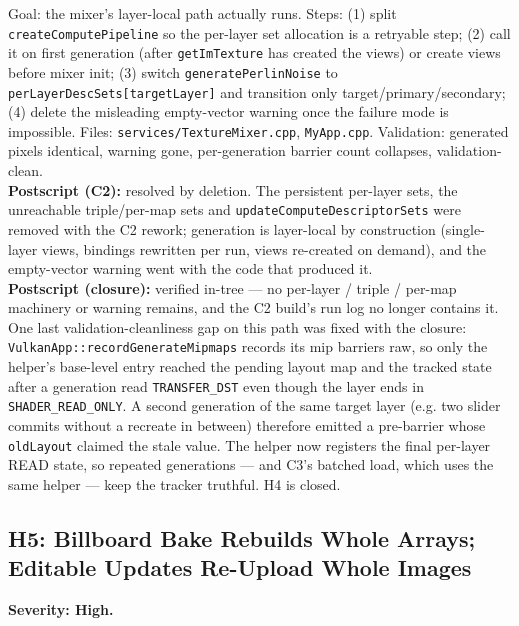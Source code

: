 \documentclass[11pt,a4paper]{article}
\begin{document}
\begin{tcolorbox}[promptbox={Prompt --- H4: revive the per-layer descriptor sets}]
Goal: the mixer's layer-local path actually runs. Steps: (1) split
\texttt{createComputePipeline} so the per-layer set allocation is a retryable
step; (2) call it on first generation (after \texttt{getImTexture} has created
the views) or create views before mixer init; (3) switch
\texttt{generatePerlinNoise} to \texttt{perLayerDescSets[targetLayer]} and
transition only target/primary/secondary; (4) delete the misleading
empty-vector warning once the failure mode is impossible. Files:
\texttt{services/TextureMixer.cpp}, \texttt{MyApp.cpp}. Validation: generated
pixels identical, warning gone, per-generation barrier count collapses,
validation-clean.
\\ \textbf{Postscript (C2):} resolved by deletion. The persistent per-layer
sets, the unreachable triple/per-map sets and
\texttt{updateComputeDescriptorSets} were removed with the C2 rework;
generation is layer-local by construction (single-layer views, bindings
rewritten per run, views re-created on demand), and the empty-vector warning
went with the code that produced it.
\\ \textbf{Postscript (closure):} verified in-tree --- no per-layer / triple /
per-map machinery or warning remains, and the C2 build's run log no longer
contains it. One last validation-cleanliness gap on this path was fixed with
the closure: \texttt{VulkanApp::recordGenerateMipmaps} records its mip
barriers raw, so only the helper's base-level entry reached the pending
layout map and the tracked state after a generation read
\texttt{TRANSFER\_DST} even though the layer ends in
\texttt{SHADER\_READ\_ONLY}. A second generation of the same target layer
(e.g. two slider commits without a recreate in between) therefore emitted a
pre-barrier whose \texttt{oldLayout} claimed the stale value. The helper now
registers the final per-layer READ state, so repeated generations --- and
C3's batched load, which uses the same helper --- keep the tracker truthful.
H4 is closed.
\end{tcolorbox}

\subsection{H5: Billboard Bake Rebuilds Whole Arrays; Editable Updates Re-Upload Whole Images}
\label{sec:h5}

\textbf{Severity: High.}
\end{document}
